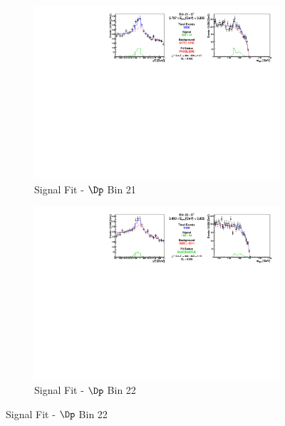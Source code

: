 \begin{figure}[h]

\begin{subfigure}[c]{0.99\textwidth}
\includegraphics[width=\textwidth]{figures/plots/fit_results/Dp_bin_21.pdf}
\caption*{Signal Fit - $\Dp$ Bin 21}
\end{subfigure}

\vspace{5pt}

\begin{subfigure}[c]{0.99\textwidth}
\includegraphics[width=\textwidth]{figures/plots/fit_results/Dp_bin_22.pdf}
\caption*{Signal Fit - $\Dp$ Bin 22}
\end{subfigure}

\vspace{5pt}


\end{figure}
